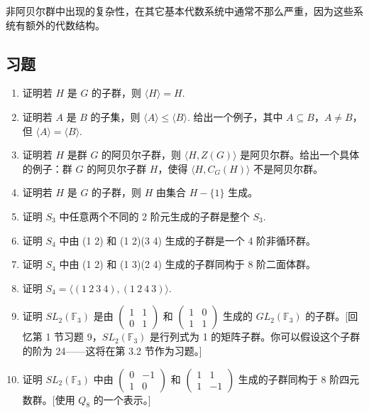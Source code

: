 非阿贝尔群中出现的复杂性，在其它基本代数系统中通常不那么严重，因为这些系统有额外的代数结构。


\subsection*{习题}

\begin{enumerate}[label=\arabic*]
\item 证明若 \(H\) 是 \(G\) 的子群，则 \(\langle H \rangle = H\).

\item 证明若 \(A\) 是 \(B\) 的子集，则 \(\langle A \rangle \leq \langle B \rangle\). 给出一个例子，其中 \(A \subseteq B\)，\(A \neq B\)，但 \(\langle A \rangle = \langle B \rangle\).

\item 证明若 \(H\) 是群 \(G\) 的阿贝尔子群，则 \(\langle H, Z(G) \rangle\) 是阿贝尔群。给出一个具体的例子：群 \(G\) 的阿贝尔子群 \(H\)，使得 \(\langle H, C_G(H) \rangle\) 不是阿贝尔群。

\item 证明若 \(H\) 是 \(G\) 的子群，则 \(H\) 由集合 \(H - \{1\}\) 生成。

\item 证明 \(S_3\) 中任意两个不同的 2 阶元生成的子群是整个 \(S_3\).

\item 证明 \(S_4\) 中由 (1 2) 和 (1 2)(3 4) 生成的子群是一个 4 阶非循环群。

\item 证明 \(S_4\) 中由 (1 2) 和 (1 3)(2 4) 生成的子群同构于 8 阶二面体群。

\item 证明 \(S_4 = \langle (1\ 2\ 3\ 4), (1\ 2\ 4\ 3) \rangle\).

\item 证明 \(SL_2(\mathbb{F}_3)\) 是由 \(\begin{pmatrix} 1 & 1 \\ 0 & 1 \end{pmatrix}\) 和 \(\begin{pmatrix} 1 & 0 \\ 1 & 1 \end{pmatrix}\) 生成的 \(GL_2(\mathbb{F}_3)\) 的子群。[回忆第 1 节习题 9，\(SL_2(\mathbb{F}_3)\) 是行列式为 1 的矩阵子群。你可以假设这个子群的阶为 24——这将在第 3.2 节作为习题。]

\item 证明 \(SL_2(\mathbb{F}_3)\) 中由 \(\begin{pmatrix} 0 & -1 \\ 1 & 0 \end{pmatrix}\) 和 \(\begin{pmatrix} 1 & 1 \\ 1 & -1 \end{pmatrix}\) 生成的子群同构于 8 阶四元数群。[使用 \(Q_8\) 的一个表示。]


\end{enumerate}
